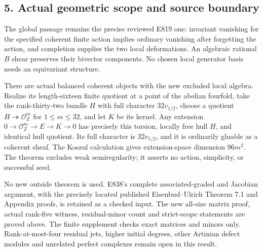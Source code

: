 \subsection{5. Actual geometric scope and source
boundary}\label{actual-geometric-scope-and-source-boundary}

The global passage remains the precise reviewed E819 one: invariant
vanishing for the specified coherent finite action implies ordinary
vanishing after forgetting the action, and completion supplies the two
local deformations. An algebraic rational \(B\) shear preserves their
bivector components. No chosen local generator basis needs an
equivariant structure.

There are actual balanced coherent objects with the new excluded local
algebra. Realize its length-sixteen finite quotient at a point of the
abelian fourfold, take the rank-thirty-two bundle \(H\) with full
character \(32v_{1/2}\), choose a quotient
\(H\twoheadrightarrow\mathcal O_Z^m\) for \(1\le m\le32\), and let \(K\)
be its kernel. Any extension \(0\to\mathcal O_Z^m\to E\to K\to0\) has
precisely this torsion, locally free hull \(H\), and identical hull
quotient. Its full character is \(32v_{1/2}\), and it is ordinarily
gluable as a coherent sheaf. The Koszul calculation gives
extension-space dimension \(96m^2\). The theorem excludes weak
semiregularity; it asserts no action, simplicity, or successful seed.

No new outside theorem is used. E838's complete associated-graded and
Jacobian argument, with the precisely located published Eisenbud--Ulrich
Theorem 7.1 and Appendix proofs, is retained as a checked input. The new
all-size matrix proof, actual rank-five witness, residual-minor count
and strict-scope statements are proved above. The finite supplement
checks exact matrices and minors only. Rank-at-most-four residual jets,
higher initial degrees, other Artinian defect modules and unrelated
perfect complexes remain open in this result.
